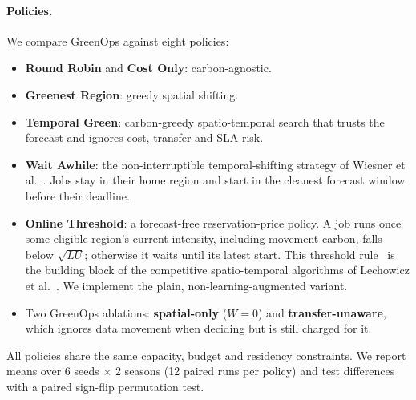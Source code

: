 \paragraph{Policies.}
We compare GreenOps against eight policies:
\begin{itemize}
\item \textbf{Round Robin} and \textbf{Cost Only}: carbon-agnostic.
\item \textbf{Greenest Region}: greedy spatial shifting.
\item \textbf{Temporal Green}: carbon-greedy spatio-temporal search that
  trusts the forecast and ignores cost, transfer and SLA risk.
\item \textbf{Wait Awhile}: the non-interruptible temporal-shifting
  strategy of Wiesner et al.~\cite{wiesner2021wait}. Jobs stay in their
  home region and start in the cleanest forecast window before their
  deadline.
\item \textbf{Online Threshold}: a forecast-free reservation-price policy.
  A job runs once some eligible region's current intensity, including
  movement carbon, falls below $\sqrt{LU}$; otherwise it waits until its
  latest start. This threshold rule~\cite{elyaniv2001search} is the
  building block of the competitive spatio-temporal algorithms of
  Lechowicz et al.~\cite{lechowicz2024soad}. We implement the plain,
  non-learning-augmented variant.
\item Two GreenOps ablations: \textbf{spatial-only} ($W=0$) and
  \textbf{transfer-unaware}, which ignores data movement when deciding
  but is still charged for it.
\end{itemize}
All policies share the same capacity, budget and residency constraints.
We report means over 6 seeds $\times$ 2 seasons (12 paired runs per policy)
and test differences with a paired sign-flip permutation test.
